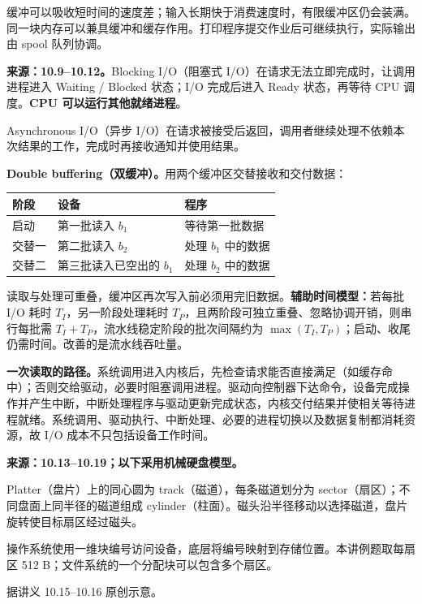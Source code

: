 缓冲可以吸收短时间的速度差；输入长期快于消费速度时，有限缓冲区仍会装满。同一块内存可以兼具缓冲和缓存作用。打印程序提交作业后可继续执行，实际输出由 spool 队列协调。


\textbf{来源：10.9--10.12。}Blocking I/O（阻塞式 I/O）在请求无法立即完成时，让调用进程进入 Waiting / Blocked 状态；I/O 完成后进入 Ready 状态，再等待 CPU 调度。\textbf{CPU 可以运行其他就绪进程}。

Asynchronous I/O（异步 I/O）在请求被接受后返回，调用者继续处理不依赖本次结果的工作，完成时再接收通知并使用结果。

\textbf{Double buffering（双缓冲）。}用两个缓冲区交替接收和交付数据：
\begin{center}
\begin{tabularx}{\textwidth}{@{}lXX@{}}
\toprule
阶段 & 设备 & 程序 \\
\midrule
启动 & 第一批读入 $b_1$ & 等待第一批数据 \\
交替一 & 第二批读入 $b_2$ & 处理 $b_1$ 中的数据 \\
交替二 & 第三批读入已空出的 $b_1$ & 处理 $b_2$ 中的数据 \\
\bottomrule
\end{tabularx}
\end{center}
读取与处理可重叠，缓冲区再次写入前必须用完旧数据。\textbf{辅助时间模型：}若每批 I/O 耗时 $T_I$，另一阶段处理耗时 $T_P$，且两阶段可独立重叠、忽略协调开销，则串行每批需 $T_I+T_P$，流水线稳定阶段的批次间隔约为 $\max(T_I,T_P)$；启动、收尾仍需时间。改善的是流水线吞吐量。

\textbf{一次读取的路径。}系统调用进入内核后，先检查请求能否直接满足（如缓存命中）；否则交给驱动，必要时阻塞调用进程。驱动向控制器下达命令，设备完成操作并产生中断，中断处理程序与驱动更新完成状态，内核交付结果并使相关等待进程就绪。系统调用、驱动执行、中断处理、必要的进程切换以及数据复制都消耗资源，故 I/O 成本不只包括设备工作时间。


\textbf{来源：10.13--10.19；以下采用机械硬盘模型。}

\noindent\begin{minipage}[c]{0.51\textwidth}
Platter（盘片）上的同心圆为 track（磁道），每条磁道划分为 sector（扇区）；不同盘面上同半径的磁道组成 cylinder（柱面）。磁头沿半径移动以选择磁道，盘片旋转使目标扇区经过磁头。

操作系统使用一维块编号访问设备，底层将编号映射到存储位置。本讲例题取每扇区 512 B；文件系统的一个分配块可以包含多个扇区。
\end{minipage}\hfill
\begin{minipage}[c]{0.46\textwidth}
\centering
\resizebox{\linewidth}{!}{}

{\footnotesize 据讲义 10.15--10.16 原创示意。}
\end{minipage}\par

